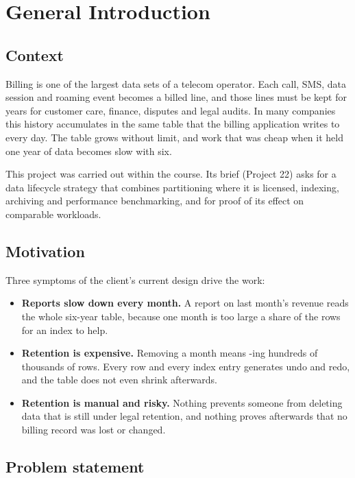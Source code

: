 \chapter{General Introduction}

\section{Context}

Billing is one of the largest data sets of a telecom operator. Each call, SMS, data session
and roaming event becomes a billed line, and those lines must be kept for years for customer
care, finance, disputes and legal audits. In many companies this history accumulates in the
same table that the billing application writes to every day. The table grows without limit,
and work that was cheap when it held one year of data becomes slow with six.

This project was carried out within the \Course{} course. Its brief (Project 22) asks for a
data lifecycle strategy that combines partitioning where it is licensed, indexing, archiving
and performance benchmarking, and for proof of its effect on comparable workloads.

\section{Motivation}

Three symptoms of the client's current design drive the work:

\begin{itemize}
  \item \textbf{Reports slow down every month.} A report on last month's revenue reads the
        whole six-year table, because one month is too large a share of the rows for an
        index to help.
  \item \textbf{Retention is expensive.} Removing a month means -ing hundreds of
        thousands of rows. Every row and every index entry generates undo and redo, and the
        table does not even shrink afterwards.
  \item \textbf{Retention is manual and risky.} Nothing prevents someone from deleting data
        that is still under legal retention, and nothing proves afterwards that no billing
        record was lost or changed.
\end{itemize}

\section{Problem statement}

